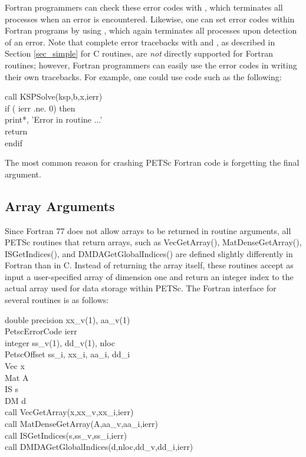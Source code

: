 Fortran programmers
can check these error codes with
, which terminates all processes when an error is
encountered.  Likewise, one can set error codes within Fortran programs by
using , which again terminates all processes
upon detection of an error.
Note that complete error tracebacks with
 and , as described in Section
\ref{sec_simple} for C routines, are {\em not} directly supported for
Fortran routines; however, Fortran programmers can easily use the
error codes in writing their own tracebacks.  For example, one could
use code such as the following:
\begin{tabbing}
   call KSPSolve(ksp,b,x,ierr)\\
   if ( ierr .ne. 0) then\\
       print*, 'Error in routine ...'\\
       return\\
   endif
\end{tabbing}

The most common reason for crashing PETSc Fortran code is forgetting the
final  argument.

\subsection{Array Arguments}
\label{sec_fortranarrays}

Since Fortran 77 does not allow arrays to be returned in routine
arguments, all PETSc routines that return arrays, such as
VecGetArray(), MatDenseGetArray(),
ISGetIndices(), and DMDAGetGlobalIndices()
are defined slightly differently in Fortran than in C.
Instead of returning the array itself, these routines
accept as input a user-specified array of dimension one and return an
integer index to the actual array used for data storage within PETSc.
The Fortran interface for several routines is as follows:
\begin{tabbing}
   double precision xx\_v(1), aa\_v(1)\\
   PetscErrorCode ierr\\
   integer          ss\_v(1), dd\_v(1), nloc\\
   PetscOffset      ss\_i, xx\_i, aa\_i, dd\_i\\
   Vec x\\
   Mat A\\
   IS  s\\
   DM  d \\

   call VecGetArray(x,xx\_v,xx\_i,ierr)\\
   call MatDenseGetArray(A,aa\_v,aa\_i,ierr)\\
   call ISGetIndices(s,ss\_v,ss\_i,ierr)\\
   call DMDAGetGlobalIndices(d,nloc,dd\_v,dd\_i,ierr)
\end{tabbing}

